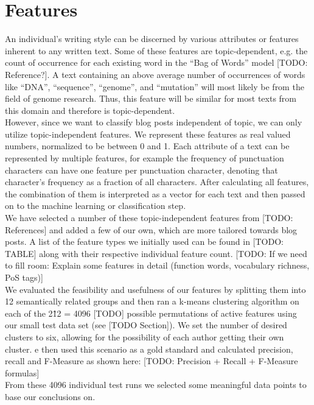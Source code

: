 \section{Features}
\label{sec:feautres}

An individual's writing style can be discerned by various attributes or features inherent to any written text.
Some of these features are topic-dependent, e.g. the count of occurrence for each existing word in the “Bag of Words” model [TODO: Reference?].
A text containing an above average number of occurrences of words like “DNA”, “sequence”, “genome”, and “mutation” will most likely be from the field of genome research.
Thus, this feature will be similar for most texts from this domain and therefore is topic-dependent.
\\
However, since we want to classify blog posts independent of topic, we can only utilize topic-independent features.
We represent these features as real valued numbers, normalized to be between 0 and 1.
Each attribute of a text can be represented by multiple features, for example the frequency of punctuation characters can have one feature per punctuation character, denoting that character's frequency as a fraction of all characters.
After calculating all features, the combination of them is interpreted as a vector for each text and then passed on to the machine learning or classification step.
\\
We have selected a number of these topic-independent features from [TODO: References] and added a few of our own, which are more tailored towards blog posts.
A list of the feature types we initially used can be found in [TODO: TABLE] along with their respective individual feature count.
[TODO: If we need to fill room: Explain some features in detail (function words, vocabulary richness, PoS tags)]
\\
We evaluated the feasibility and usefulness of our features by splitting them into 12 semantically related groups and then ran a k-means clustering algorithm on each of the 2\^12 = 4096 [TODO] possible permutations of active features using our small test data set (see [TODO Section]).
We set the number of desired clusters to six, allowing for the possibility of each author getting their own cluster. 
e then used this scenario as a gold standard and calculated precision, recall and F-Measure as shown here: [TODO: Precision + Recall + F-Measure formulas]
\\
From these 4096 individual test runs we selected some meaningful data points to base our conclusions on.
